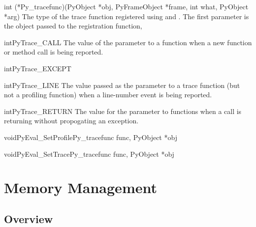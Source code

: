 \documentclass{manual}
\begin{document}
\begin{ctypedesc}[Py_tracefunc]{int (*Py_tracefunc)(PyObject *obj,
                                PyFrameObject *frame, int what,
                                PyObject *arg)}
  The type of the trace function registered using
   and .
  The first parameter is the object passed to the registration
  function, 
\end{ctypedesc}

\begin{cvardesc}{int}{PyTrace_CALL}
  The value of the  parameter to a 
  function when a new function or method call is being reported.
\end{cvardesc}

\begin{cvardesc}{int}{PyTrace_EXCEPT}
\end{cvardesc}

\begin{cvardesc}{int}{PyTrace_LINE}
  The value passed as the  parameter to a trace function
  (but not a profiling function) when a line-number event is being
  reported.
\end{cvardesc}

\begin{cvardesc}{int}{PyTrace_RETURN}
  The value for the  parameter to 
  functions when a call is returning without propogating an exception.
\end{cvardesc}

\begin{cfuncdesc}{void}{PyEval_SetProfile}{Py_tracefunc func, PyObject *obj}
\end{cfuncdesc}

\begin{cfuncdesc}{void}{PyEval_SetTrace}{Py_tracefunc func, PyObject *obj}
\end{cfuncdesc}


\chapter{Memory Management \label{memory}}


\section{Overview \label{memoryOverview}}
\end{document}
